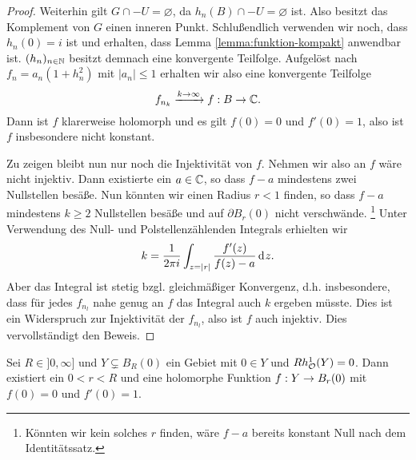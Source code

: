 \begin{proof}
  Weiterhin gilt $G \cap -U = \varnothing$, da $h_n(B) \cap -U =
  \varnothing$ ist. Also besitzt das Komplement von $G$ einen inneren Punkt.
  Schlußendlich verwenden wir noch, dass $h_n(0) = i$ ist und
  erhalten, dass Lemma \ref{lemma:funktion-kompakt} anwendbar ist.
  $(h_n)_{n \in \mathbb{N}}$ besitzt demnach
  eine konvergente Teilfolge. Aufgelöst nach $f_n =
  a_n(1 + h_n^2)$ mit $|a_n| \leq 1$ erhalten wir also eine
  konvergente Teilfolge
  \[
  f_{n_k} \xrightarrow{k \rightarrow \infty} f: B \rightarrow \mathbb{C}.
  \]
  Dann ist $f$ klarerweise holomorph und es gilt $f(0) = 0$ und $f'(0)
  = 1$, also ist $f$ insbesondere nicht konstant.

  Zu zeigen bleibt nun nur noch die Injektivität von $f$.
  Nehmen wir also an $f$ wäre nicht injektiv. Dann existierte ein $a \in \mathbb{C}$,
  so dass $f-a$ mindestens zwei Nullstellen besäße. Nun könnten wir
  einen Radius $r < 1$ finden, so dass $f-a$ mindestens $k\geq 2$
  Nullstellen besäße und auf $\partial B_r(0)$ nicht
  verschwände. \footnote{Könnten wir kein solches $r$ finden, wäre $f-a$
  bereits konstant Null nach dem Identitätssatz.} Unter Verwendung des
  Null- und Polstellenzählenden Integrals erhielten wir
  \[
  k = \frac1{2\pi i} \int_{z = |r|} \frac{f'(z)}{f(z) - a} \d[z].
  \]
  Aber das Integral ist stetig bzgl. gleichmäßiger Konvergenz,
  d.h. insbesondere, dass für jedes $f_{n_l}$ nahe genug an $f$ das
  Integral auch $k$ ergeben müsste. Dies ist ein Widerspruch zur
  Injektivität der $f_{n_l}$, also ist $f$ auch injektiv. 
  Dies vervollständigt den Beweis.
\end{proof}

\begin{lemma}
  \label{lemma:bihol-kreis}
  Sei $R \in ]0, \infty]$ und $Y \subsetneq B_R(0)$ ein Gebiet mit $0 \in Y$
  und $Rh_{\mathcal{O}}^1(Y) = 0$. 
  Dann existiert ein $0< r <R$ und eine holomorphe Funktion $f: Y \rightarrow B_r(0)$ mit $f(0) =
  0$ und $f'(0) = 1$.
\end{lemma}

